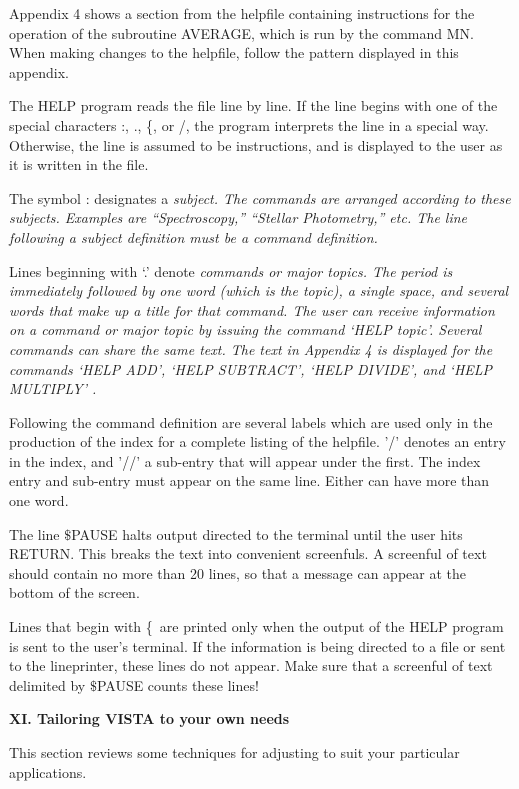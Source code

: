 	Appendix 4 shows a section from the helpfile containing
instructions for the operation of the subroutine AVERAGE, which is run
by the command MN.  When making changes to the helpfile, follow the
pattern displayed in this appendix. 

	The HELP program reads the file line by line.  If the line
begins with one of the special characters :, ., \{, or /, the program
interprets the line in a special way.  Otherwise, the line is assumed
to be instructions, and is displayed to the user as it is written in
the file. 

	The symbol : designates a \it subject\rm.  The \V
commands are arranged according to these subjects.  Examples are
``Spectroscopy,'' ``Stellar Photometry,'' etc.  The line
following a subject definition must be a command definition. 

	Lines beginning with `.' denote \it commands \rm or \it
major topics\rm . The period is immediately followed by one word
(which is the topic), a single space, and several words that make
up a title for that command.  The user can receive information on
a command or major topic by issuing the \V command `HELP topic'. 
Several commands can share the same text.  The text in Appendix 4
is displayed for the commands `HELP ADD', `HELP SUBTRACT', `HELP DIVIDE',
and `HELP MULTIPLY' . 

	Following the command definition are several labels which
are used only in the production of the index for a complete
listing of the helpfile.  '/' denotes an entry in the index, and
'//' a sub-entry that will appear under the first.  The index
entry and sub-entry must appear on the same line.  Either can
have more than one word. 

	The line $\$ $PAUSE halts output directed to the terminal
until the user hits RETURN. This breaks the text into convenient
screenfuls.  A screenful of text should contain no more than 20 
lines, so that a message can appear at the bottom of the screen.

	Lines that begin with \{\  are printed only when the output
of the HELP program is sent to the user's terminal. If the information
is being directed to a file or sent to the lineprinter, 
these lines do not appear.  Make sure that a screenful of text 
delimited by $\$$PAUSE counts these lines!

\Sskip
\centerline {\bf XI. Tailoring VISTA to your own needs\rm}

\vskip 0.125in
	This section reviews some techniques for adjusting \V to suit
your particular applications.

